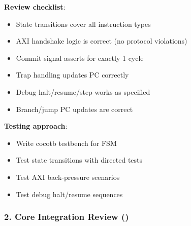 \begin{record}

\textbf{Review checklist}:

\begin{itemize}
\tightlist
\item[$\square$]
  State transitions cover all instruction types
\item[$\square$]
  AXI handshake logic is correct (no protocol violations)
\item[$\square$]
  Commit signal asserts for exactly 1 cycle
\item[$\square$]
  Trap handling updates PC correctly
\item[$\square$]
  Debug halt/\allowbreak{}resume/\allowbreak{}step works as specified
\item[$\square$]
  Branch/\allowbreak{}jump PC updates are correct
\end{itemize}

\textbf{Testing approach}:

\begin{itemize}
\tightlist
\item
  Write cocotb testbench for FSM
\item
  Test state transitions with directed tests
\item
  Test AXI back-pressure scenarios
\item
  Test debug halt/\allowbreak{}resume sequences
\end{itemize}

\end{record}

\subsubsection{\texorpdfstring{2. Core Integration Review
()}{2. Core Integration Review ()}}\label{cr:fix:cpu-integration-summary:2-core-integration-review-rv32i-coresv}


